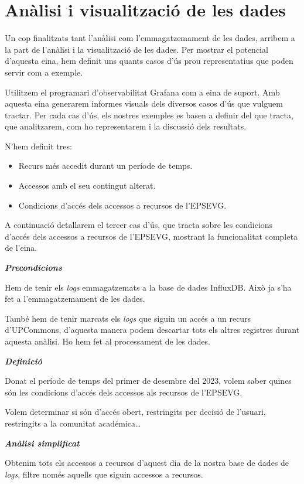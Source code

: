 \documentclass[lettersize,journal]{IEEEtran}
\begin{document}
\section{Anàlisi i visualització de les dades}\label{sec:data-visualization}
Un cop finalitzats tant l'anàlisi com l'emmagatzemament de les dades, arribem a la part de l'anàlisi i la visualització de les dades.
Per mostrar el potencial d'aquesta eina, hem definit uns quants casos d'ús prou representatius que poden servir com a exemple.

Utilitzem el programari d'observabilitat Grafana com a eina de suport.
Amb aquesta eina generarem informes visuals dels diversos casos d'ús que vulguem tractar.
Per cada cas d'ús, els nostres exemples es basen a definir del que tracta, que analitzarem, com ho representarem i la discussió dels resultats.

N'hem definit tres:
\begin{itemize}
    \item Recurs més accedit durant un període de temps.
    \item Accessos amb el seu contingut alterat.
    \item Condicions d'accés dels accessos a recursos de l'EPSEVG.
\end{itemize}

A continuació detallarem el tercer cas d'ús, que tracta sobre les condicions d'accés dels accessos a recursos de l'EPSEVG, mostrant la funcionalitat completa de l'eina.

\textit{\textbf{Precondicions}}

Hem de tenir els \textit{logs} emmagatzemats a la base de dades InfluxDB.
Això ja s'ha fet a l'emmagatzemament de les dades.

També hem de tenir marcats els \textit{logs} que siguin un accés a un recurs d'UPCommons, d'aquesta manera podem descartar tots els altres registres durant aquesta anàlisi.
Ho hem fet al processament de les dades.

\textit{\textbf{Definició}}

Donat el període de temps del primer de desembre del 2023, volem saber quines són les condicions d'accés dels accessos als recursos de l'EPSEVG.

Volem determinar si són d'accés obert, restringits per decisió de l'usuari, restringits a la comunitat académica\dots

\textit{\textbf{Anàlisi simplificat}}

Obtenim tots els accessos a recursos d'aquest dia de la nostra base de dades de \textit{logs}, filtre només aquells que siguin accessos a recursos.
\end{document}
